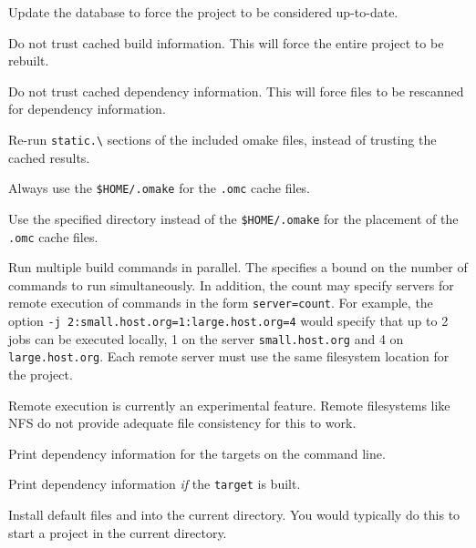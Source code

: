 \begin{Description}
\item[\Opt{-t}] Update the  database to force the project to be considered up-to-date.

\item[\Opt{-U}] Do not trust cached build information.  This will force the entire project to be rebuilt.

\item[\Opt{--depend}] Do not trust cached dependency information.  This will force files to be rescanned
for dependency information.

\item[\Opt{--configure}] Re-run \verb+static.\+ sections of the included omake files, instead of
trusting the cached results.

\item[\oOpt{--force-dotomake}] Always use the \verb+$HOME/.omake+ for the \verb+.omc+ cache files.

\item[\oOptArg{--dotomake}{\ dir}] Use the specified directory instead of the \verb+$HOME/.omake+
for the placement of the \verb+.omc+ cache files.

\item[\OptArg{-j}{count}] Run multiple build commands in parallel.  The  specifies a
bound on the number of commands to run simultaneously.  In addition, the count may specify servers
for remote execution of commands in the form \verb+server=count+.  For example, the option
\verb+-j 2:small.host.org=1:large.host.org=4+ would specify that up to 2 jobs can be executed
locally, 1 on the server \verb+small.host.org+ and 4 on \verb+large.host.org+.  Each remote server
must use the same filesystem location for the project.

Remote execution is currently an experimental feature.  Remote filesystems like NFS do not provide
adequate file consistency for this to work.

\item[\Opt{--print-dependencies}] Print dependency information for the targets on the command line.

\item[\OptArg{--show-dependencies}{\ target}] Print dependency information \emph{if} the \verb+target+ is built.

\item[\Opt{--install}] Install default files  and  into the current
  directory.  You would typically do this to start a project in the current directory.


\end{Description}
